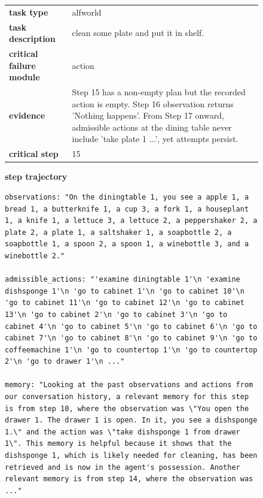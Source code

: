 \documentclass[../../main.tex]{subfiles}
\begin{document}
\begin{figure}[htbp]
\centering

\begin{tcolorbox}[
    title=\textbf{Error Type - Format Error},
    colback=orange!1!white,
    colframe=orange!50!black,
    fonttitle=\bfseries,
    enhanced jigsaw,
    breakable
]
\small


\begin{tabularx}{\linewidth}{@{}lX@{}}
\textbf{task type} & alfworld \\
\textbf{task description} & clean some plate and put it in shelf. \\
\textbf{critical failure module} & action \\
\textbf{evidence} &Step 15 has a non-empty plan but the recorded action is empty. Step 16 observation returns 'Nothing happens'. From Step 17 onward, admissible actions at the dining table never include 'take plate 1 ...', yet attempts persist. \\
\textbf{critical step} & 15 \\
\end{tabularx}

\medskip
\textbf{step trajectory}

\begin{Verbatim}[breaklines=true, breakanywhere=true]
observations: "On the diningtable 1, you see a apple 1, a bread 1, a butterknife 1, a cup 3, a fork 1, a houseplant 1, a knife 1, a lettuce 3, a lettuce 2, a peppershaker 2, a plate 2, a plate 1, a saltshaker 1, a soapbottle 2, a soapbottle 1, a spoon 2, a spoon 1, a winebottle 3, and a winebottle 2."

admissible_actions: "'examine diningtable 1'\n 'examine dishsponge 1'\n 'go to cabinet 1'\n 'go to cabinet 10'\n 'go to cabinet 11'\n 'go to cabinet 12'\n 'go to cabinet 13'\n 'go to cabinet 2'\n 'go to cabinet 3'\n 'go to cabinet 4'\n 'go to cabinet 5'\n 'go to cabinet 6'\n 'go to cabinet 7'\n 'go to cabinet 8'\n 'go to cabinet 9'\n 'go to coffeemachine 1'\n 'go to countertop 1'\n 'go to countertop 2'\n 'go to drawer 1'\n ..."

memory: "Looking at the past observations and actions from our conversation history, a relevant memory for this step is from step 10, where the observation was \"You open the drawer 1. The drawer 1 is open. In it, you see a dishsponge 1.\" and the action was \"take dishsponge 1 from drawer 1\". This memory is helpful because it shows that the dishsponge 1, which is likely needed for cleaning, has been retrieved and is now in the agent's possession. Another relevant memory is from step 14, where the observation was ..."


\end{Verbatim}
\end{tcolorbox}
\end{figure}
\end{document}
